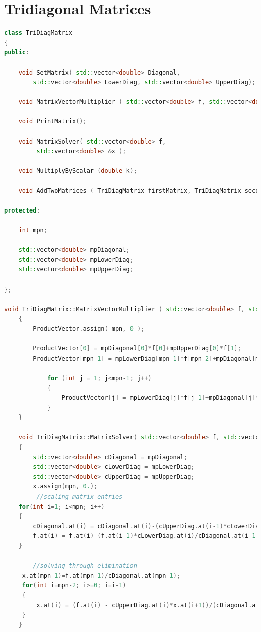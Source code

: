\documentclass{uonmathreport}
\theoremstyle{definition}
\theoremstyle{problem}
\theoremstyle{theorem}
\begin{document}
\section{Tridiagonal Matrices} \label{app:rawdata}

\begin{lstlisting}[language=C++]
class TriDiagMatrix
{
public:

    void SetMatrix( std::vector<double> Diagonal,
        std::vector<double> LowerDiag, std::vector<double> UpperDiag);

    void MatrixVectorMultiplier ( std::vector<double> f, std::vector<double> &ProductVector);

    void PrintMatrix();

    void MatrixSolver( std::vector<double> f,
         std::vector<double> &x );

    void MultiplyByScalar (double k);

    void AddTwoMatrices ( TriDiagMatrix firstMatrix, TriDiagMatrix secondMatix );

protected:

    int mpn;

    std::vector<double> mpDiagonal;
    std::vector<double> mpLowerDiag;
    std::vector<double> mpUpperDiag;

};

void TriDiagMatrix::MatrixVectorMultiplier ( std::vector<double> f, std::vector<double> &ProductVector )
    {
        ProductVector.assign( mpn, 0 );

        ProductVector[0] = mpDiagonal[0]*f[0]+mpUpperDiag[0]*f[1];
        ProductVector[mpn-1] = mpLowerDiag[mpn-1]*f[mpn-2]+mpDiagonal[mpn-1]*f[mpn-1];

            for (int j = 1; j<mpn-1; j++)
            {
                ProductVector[j] = mpLowerDiag[j]*f[j-1]+mpDiagonal[j]*f[j]+mpUpperDiag[j]*f[j+1];
            }
    }
    
    void TriDiagMatrix::MatrixSolver( std::vector<double> f, std::vector<double> &x )
    {
        std::vector<double> cDiagonal = mpDiagonal;
        std::vector<double> cLowerDiag = mpLowerDiag;
        std::vector<double> cUpperDiag = mpUpperDiag;
        x.assign(mpn, 0.);
         //scaling matrix entries
    for(int i=1; i<mpn; i++)
    {
        cDiagonal.at(i) = cDiagonal.at(i)-(cUpperDiag.at(i-1)*cLowerDiag.at(i)/cDiagonal.at(i-1));
        f.at(i) = f.at(i)-(f.at(i-1)*cLowerDiag.at(i)/cDiagonal.at(i-1));
    }

        //solving through elimination
     x.at(mpn-1)=f.at(mpn-1)/cDiagonal.at(mpn-1);
     for(int i=mpn-2; i>=0; i=i-1)
     {
         x.at(i) = (f.at(i) - cUpperDiag.at(i)*x.at(i+1))/(cDiagonal.at(i));
     }
    }

\end{lstlisting}
\end{document}
